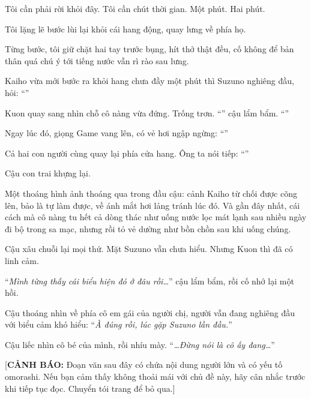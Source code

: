 \documentclass[../main.tex]{subfiles}
\begin{document}
Tôi cần phải rời khỏi đây. Tôi cần chút thời gian. Một phút. Hai phút.

Tôi lặng lẽ bước lùi lại khỏi cái hang động, quay lưng về phía họ.

Từng bước, tôi giữ chặt hai tay trước bụng, hít thở thật đều, cố không để bản thân quá chú ý tới tiếng nước vẫn rì rào sau lưng.

\pov{-}

Kaiho vừa mới bước ra khỏi hang chưa đầy một phút thì Suzuno nghiêng đầu, hỏi: ``''

Kuon quay sang nhìn chỗ cô nàng vừa đứng. Trống trơn. ``'' cậu lẩm bẩm. ``''

Ngay lúc đó, giọng Game vang lên, có vẻ hơi ngập ngừng: ``''

Cả hai con người cùng quay lại phía cửa hang. Ông ta nói tiếp: ``''

Cậu con trai khựng lại.

Một thoáng hình ảnh thoáng qua trong đầu cậu: cảnh Kaiho từ chối được cõng lên, bảo là tự làm được, về ánh mắt hơi lảng tránh lúc đó. Và gần đây nhất, cái cách mà cô nàng tu hết cả dòng thác như uống nước lọc mát lạnh sau nhiều ngày đi bộ trong sa mạc, nhưng rồi tỏ vẻ dường như bồn chồn sau khi uống chúng.

Cậu xâu chuỗi lại mọi thứ. Mặt Suzuno vẫn chưa hiểu. Nhưng Kuon thì đã có linh cảm.

``\textit{Mình từng thấy cái biểu hiện đó ở đâu rồi\dots}'' cậu lẩm bẩm, rồi cố nhớ lại một hồi.

Cậu thoáng nhìn về phía cô em gái của người chị, người vẫn đang nghiêng đầu với biểu cảm khó hiểu: ``\textit{À đúng rồi, lúc gặp Suzuno lần đầu.}''

Cậu liếc nhìn cô bé của mình, rồi nhíu mày. ``\textit{\dots Đừng nói là cô ấy đang\dots}''

\begin{center}
  [{\color{red}\textbf{CẢNH BÁO:}} Đoạn văn sau đây có chứa nội dung người lớn và có yếu tố omorashi. Nếu bạn cảm thấy không thoải mái với chủ đề này, hãy cân nhắc trước khi tiếp tục đọc. Chuyển tói trang \pageref{skip} để bỏ qua.]
\end{center}

\end{document}
